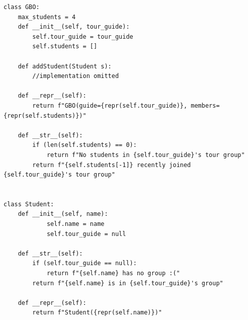 \begin{blocksection}
\begin{solution}
\begin{lstlisting}
class GBO:
    max_students = 4
    def __init__(self, tour_guide):
        self.tour_guide = tour_guide
        self.students = []
            
    def addStudent(Student s):
        //implementation omitted
    
    def __repr__(self):
        return f"GBO(guide={repr(self.tour_guide)}, members={repr(self.students)})"
    
    def __str__(self): 
        if (len(self.students) == 0):
            return f"No students in {self.tour_guide}'s tour group"
        return f"{self.students[-1]} recently joined {self.tour_guide}'s tour group"
    
    
class Student:
    def __init__(self, name):
            self.name = name
            self.tour_guide = null
    
    def __str__(self): 
        if (self.tour_guide == null):
            return f"{self.name} has no group :("
        return f"{self.name} is in {self.tour_guide}'s group"
    
    def __repr__(self):
        return f"Student({repr(self.name)})"
\end{lstlisting}
\end{solution}
\end{blocksection}
